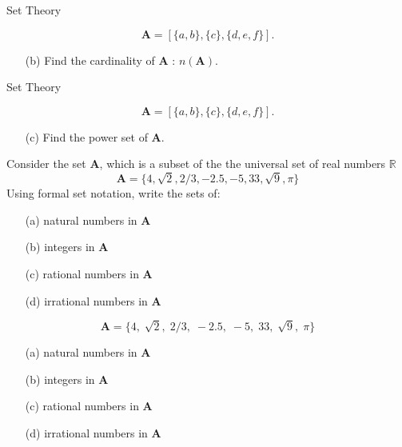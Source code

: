 \documentclass[11pt,a4paper,titlepage,oneside,openany]{article}
\numberwithin{equation}{section}
\numberwithin{algorithm}{section}
\numberwithin{figure}{section}
\numberwithin{table}{section}
\begin{document}
{%

{Set Theory}

\[\boldsymbol{A} = [\{a, b\}, \{c\},\{d, e, f \}]. \]
\begin{itemize}
\item[(b)] Find the cardinality of \textbf{A} : $n(\boldsymbol{A})$. 
\end{itemize}



{Set Theory}

\[\boldsymbol{A} = [\{a, b\}, \{c\},\{d, e, f \}]. \]
\begin{itemize}
\item[(c)] Find the power set of \textbf{A}. 
\end{itemize}





Consider the set \textbf{A}, which is a subset of the the universal set of real numbers $\mathbb{R}$
 \[\boldsymbol{A} = \{4, \sqrt{2}, 2/3, -2.5, -5, 33, \sqrt{9}, \pi \}\]
Using formal set notation, write the sets of:
\begin{itemize}
\item[(a)] natural numbers in \textbf{A}
\item[(b)] integers in \textbf{A}
\item[(c)] rational numbers in \textbf{A}
\item[(d)] irrational numbers in \textbf{A}
\end{itemize}



\[\boldsymbol{A} = \{4,\; \sqrt{2},\; 2/3,\; -2.5,\; -5,\; 33,\; \sqrt{9},\; \pi \}\]
\begin{itemize}
\item[(a)] natural numbers in \textbf{A}\\
\item[(b)] integers in \textbf{A}\\
\item[(c)] rational numbers in \textbf{A}\\
\item[(d)] irrational numbers in \textbf{A}\\
\end{itemize}


}
\end{document}
